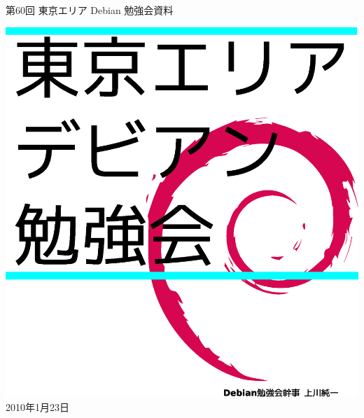 \documentclass[mingoth,a4paper]{jsarticle}
\newcommand{\debmtgyear}{2010}
\newcommand{\debmtgmonth}{1}
\newcommand{\debmtgdate}{23}
\newcommand{\debmtgnumber}{60}
\begin{document}
\begin{titlepage}
\thispagestyle{empty}


\vspace*{-2cm}
第\debmtgnumber{}回 東京エリア Debian 勉強会資料

\hspace*{-2.4cm}
\includegraphics[width=210mm]{image200801/2008title.eps}\\
\hfill{}\debmtgyear{}年\debmtgmonth{}月\debmtgdate{}日

\end{titlepage}


\end{document}
